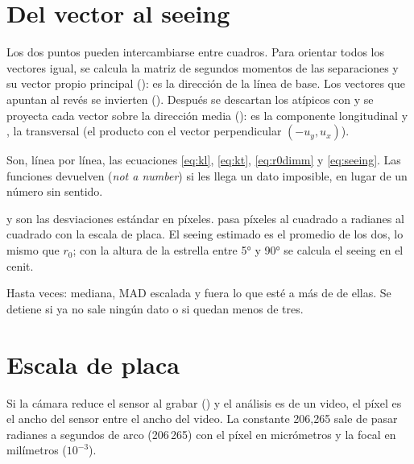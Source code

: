 \section{Del vector al seeing}


Los dos puntos pueden intercambiarse entre cuadros. Para orientar todos los vectores igual, se calcula la matriz de
segundos momentos de las separaciones y su vector propio principal (): es la dirección de la línea
de base. Los vectores que apuntan al revés se invierten (). Después se descartan los atípicos con
 y se proyecta cada vector sobre la dirección media ():  es la
componente longitudinal y , la transversal (el producto con el vector perpendicular $(-u_y, u_x)$).


Son, línea por línea, las ecuaciones \eqref{eq:kl}, \eqref{eq:kt}, \eqref{eq:r0dimm} y \eqref{eq:seeing}. Las funciones
devuelven  (\emph{not a number}) si les llega un dato imposible, en lugar de un número sin sentido.


 y  son las desviaciones estándar en píxeles.  pasa píxeles al cuadrado a radianes al
cuadrado con la escala de placa. El seeing estimado es el promedio de los dos, lo mismo que $r_0$; con la altura de la
estrella entre 5° y 90° se calcula el seeing en el cenit.


Hasta  veces: mediana, MAD escalada y fuera lo que esté a más de  de ellas. Se detiene si ya no
sale ningún dato o si quedan menos de tres.

\section{Escala de placa}


Si la cámara reduce el sensor al grabar () y el análisis es de un video, el píxel es el ancho del sensor
entre el ancho del video. La constante 206,265 sale de pasar radianes a segundos de arco (206\,265) con el píxel en
micrómetros y la focal en milímetros ($10^{-3}$).

